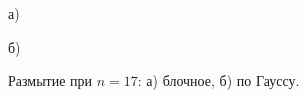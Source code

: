 \documentclass[a5paper, 10pt]{article}
\theoremstyle{definition}
\theoremstyle{plain}
\theoremstyle{remark}
\begin{document}
\begin{figure}[h!]
\begin{minipage}[h!]{0.47\linewidth}
 а) \\
\end{minipage}
\hfill
\begin{minipage}[h!]{0.47\linewidth}
 б) \\
\end{minipage}
\caption{Размытие при $n= 17$: а) блочное, б) по Гауссу.}
\end{figure}
\end{document}
